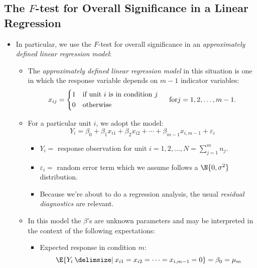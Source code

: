 \subsection{The \texorpdfstring{$ F $}{F}-test for Overall Significance in a Linear Regression}
\begin{itemize}
      \item In particular, we use the $ F $-test for overall significance in an
            \emph{approximately defined linear regression model}:
            \begin{itemize}
                  \item The \emph{approximately defined linear regression model}
                        in this situation is one in which the response
                        variable depends on $ m-1 $ indicator variables:
                        \[ x_{ij}=\begin{cases*}
                                    1 & if unit $ i $ is in condition $ j $ \\
                                    0 & otherwise
                              \end{cases*}\quad\text{for}j=1,2,\ldots,m-1. \]
                  \item For a particular unit $ i $, we adopt the model:
                        \[ Y_{i}=\beta_0+\beta_1x_{i1}+\beta_2x_{i2}+\cdots+\beta_{m-1}x_{i,m-1}+\varepsilon_i \]
                        \begin{itemize}
                              \item $ Y_i = $ response observation for unit $ i=1,2,\ldots,N=\sum_{j=1}^{m} n_j $.
                              \item $ \varepsilon_i = $ random error term which we assume follows a $ \N{0,\sigma^2} $ distribution.
                              \item Because we're about to do a regression analysis, the usual \emph{residual diagnostics} are relevant.
                        \end{itemize}
                  \item In this model the $ \beta $'s are unknown parameters
                        and may be interpreted in the context of the
                        following expectations:
                        \begin{itemize}
                              \item Expected response in condition $ m $:
                                    \[ \E{Y_i\given x_{i1}=x_{i2}=\cdots=x_{i,m-1}=0}=\beta_0=\mu_m \]

\end{itemize}
\end{itemize}
\end{itemize}
